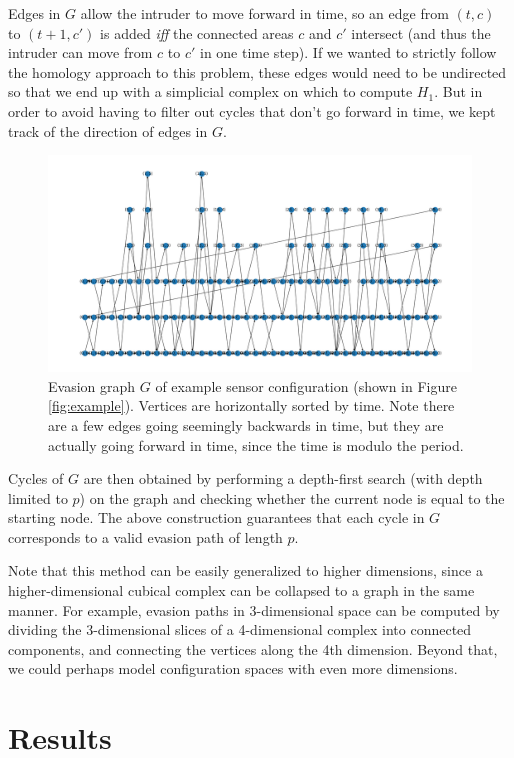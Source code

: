 \documentclass{article}
\begin{document}
Edges in $G$ allow the intruder to move forward in time, so an edge from $(t, c)$ to $(t + 1, c')$ is added {\it iff} the connected areas $c$ and $c'$ intersect (and thus the intruder can move from $c$ to $c'$ in one time step).
If we wanted to strictly follow the homology approach to this problem, these edges would need to be undirected so that we end up with a simplicial complex on which to compute $H_1$.
But in order to avoid having to filter out cycles that don't go forward in time, we kept track of the direction of edges in $G$.

\begin{figure}[H]
  \centering
  \includegraphics[width=\textwidth]{example_graph.png}
  \caption{Evasion graph $G$ of example sensor configuration (shown in Figure \ref{fig:example}). Vertices are horizontally sorted by time. Note there are a few edges going seemingly backwards in time, but they are actually going forward in time, since the time is modulo the period.}
  \label{fig:example_graph}
\end{figure}

Cycles of $G$ are then obtained by performing a depth-first search (with depth limited to $p$) on the graph and checking whether the current node is equal to the starting node.
The above construction guarantees that each cycle in $G$ corresponds to a valid evasion path of length $p$.

Note that this method can be easily generalized to higher dimensions, since a higher-dimensional cubical complex can be collapsed to a graph in the same manner. For example, evasion paths in 3-dimensional space can be computed by dividing the 3-dimensional slices of a 4-dimensional complex into connected components, and connecting the vertices along the 4th dimension.
Beyond that, we could perhaps model configuration spaces with even more dimensions.

\section{Results}
\end{document}
